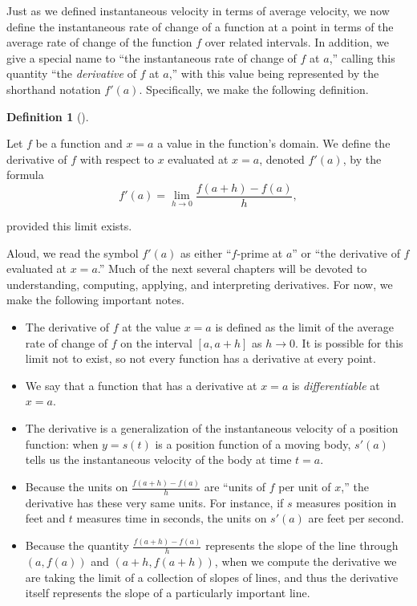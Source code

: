 \documentclass[10pt,]{book}
\theoremstyle{plain}
\theoremstyle{definition}
\newtheorem{definition}[theorem]{Definition}
\theoremstyle{definition}
\theoremstyle{definition}
\theoremstyle{definition}
\theoremstyle{definition}
\numberwithin{equation}{section}
\begin{document}
Just as we defined instantaneous velocity in terms of average velocity, we now define the instantaneous rate of change of a function at a point in terms of the average rate of change of the function \(f\) over related intervals. In addition, we give a special name to ``the instantaneous rate of change of \(f\) at \(a\),''\index{} calling this quantity ``the \emph{derivative} of \(f\) at \(a\),'' with this value being represented by the shorthand notation \(f'(a)\). Specifically, we make the following definition.
%
\begin{definition}[{}]\label{def-derivative}

Let \(f\) be a function and \(x = a\) a value in the function's domain. We define the derivative of \(f\) with respect to \(x\) evaluated at \(x = a\)\index{}, denoted \(f'(a)\), by the formula
%
\begin{equation*}
f'(a) = \lim_{h \to 0} \frac{f(a+h)-f(a)}{h},
\end{equation*}\par

provided this limit exists.
%
\end{definition}
\par

Aloud, we read the symbol \(f'(a)\) as either ``\(f\)-prime at \(a\)'' or ``the derivative of \(f\) evaluated at \(x = a\).'' Much of the next several chapters will be devoted to understanding, computing, applying, and interpreting derivatives. For now, we make the following important notes.
%
\leavevmode%
\begin{itemize}[label=\textbullet]
\item{}The derivative of \(f\) at the value \(x = a\) is defined as the limit of the average rate of change of \(f\) on the interval \([a,a+h]\) as \(h \to 0\).  It is possible for this limit not to exist, so not every function has a derivative at every point.%
\item{}We say that a function that has a derivative at \(x = a\) is \emph{differentiable}\index{} at \(x = a\).%
\item{}The derivative is a generalization of the instantaneous velocity of a position function:  when \(y = s(t)\) is a position function of a moving body, \(s'(a)\) tells us the instantaneous velocity of the body at time \(t=a\).%
\item{}Because the units on \(\frac{f(a+h)-f(a)}{h}\) are ``units of \(f\) per unit of \(x\),'' the derivative has these very same units.  For instance, if \(s\) measures position in feet and \(t\) measures time in seconds, the units on \(s'(a)\) are feet per second.%
\item{}Because the quantity \(\frac{f(a+h)-f(a)}{h}\) represents the slope of the line through \((a,f(a))\) and \((a+h, f(a+h))\), when we compute the derivative we are taking the limit of a collection of slopes of lines, and thus the derivative itself represents the slope of a particularly important line.%
\end{itemize}
\par
\end{document}
